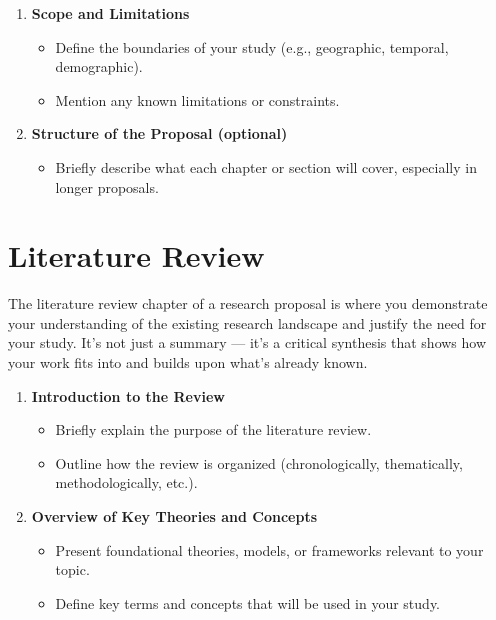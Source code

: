 \documentclass[PCOM,Proposal,Review]{mpThesis}
\newcommand{\Hd}[1]{{\color{SteelBlue}\bf#1}}
\begin{document}
\begin{MainMatter}
\begin{Remark}
\begin{enumerate}
\item \Hd{Scope and Limitations}
  \begin{itemize}
  \item Define the boundaries of your study (e.g., geographic, temporal, demographic).

  \item Mention any known limitations or constraints.
  \end{itemize}

\item \Hd{Structure of the Proposal (optional)}
  \begin{itemize}
  \item Briefly describe what each chapter or section will cover, especially in longer proposals.
  \end{itemize}
\end{enumerate}
\end{Remark}

\chapter{Literature Review}
\label{ch:literature}
\minitoc

\begin{Remark}
The literature review chapter of a research proposal is where you demonstrate your understanding of the existing research landscape and justify the need for your study.
It's not just a summary --- it’s a critical synthesis that shows how your work fits into and builds upon what’s already known.
\begin{enumerate}
\item \Hd{Introduction to the Review}
  \begin{itemize}
  \item Briefly explain the purpose of the literature review.

  \item Outline how the review is organized (chronologically, thematically, methodologically, etc.).
  \end{itemize}

\item \Hd{Overview of Key Theories and Concepts}
  \begin{itemize}
  \item Present foundational theories, models, or frameworks relevant to your topic.

  \item Define key terms and concepts that will be used in your study.
  \end{itemize}


\end{enumerate}
\end{Remark}
\end{MainMatter}
\end{document}

